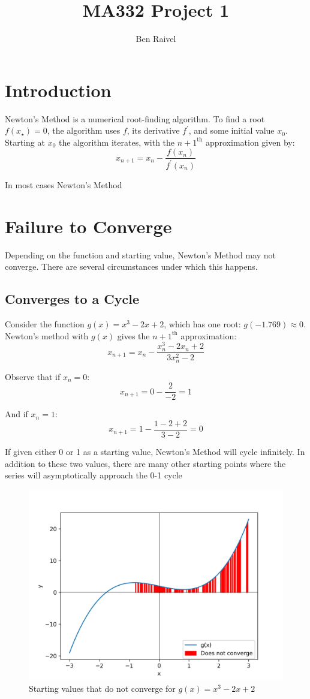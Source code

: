 \documentclass[10pt,a4paper]{article}
\title{MA332 Project 1}
\author{Ben Raivel}
\begin{document}
	\maketitle
	\section{Introduction}
	Newton's Method is a numerical root-finding algorithm. To find a root $ f(x_\star) = 0 $, the algorithm uses $f$, its derivative $f^\prime$, and some initial value $x_0$. Starting at $x_0$ the algorithm iterates, with the  $ n+1^\text{th} $ approximation given by:
	$$ x_{n+1} = x_n - \frac{f(x_n)}{f^\prime(x_n)} $$
	
	In most cases Newton's Method
	\section{Failure to Converge}
	Depending on the function and starting value, Newton's Method may not converge. There are several circumstances under which this happens.
	
		\subsection{Converges to a Cycle}
		
		Consider the function $ g(x) = x^3 - 2x  + 2 $, which has one root: $ g(-1.769) \approx 0$. Newton's method with $g(x)$ gives the $ n+1^\text{th} $ approximation:
		$$ x_{n+1} = x_n - \frac{x_n^3 - 2x_n + 2}{3x_n^2 - 2} $$
		
		Observe that if $x_n = 0$:
		$$ x_{n+1} = 0 - \frac{2}{-2} = 1 $$
		
		And if $x_n = 1$:
		$$ x_{n+1} = 1 - \frac{1 - 2 + 2}{3 - 2} =  0 $$
		
		If given either 0 or 1 as a starting value, Newton's Method will cycle infinitely. In addition to these two values, there are many other starting points where the series will asymptotically approach the 0-1 cycle
		\begin{figure}[H]
			\caption{Starting values that do not converge for $ g(x)  = x^3 - 2x + 2 $}
			\includegraphics[scale=0.75]{figure1}
		\end{figure}
\end{document}
